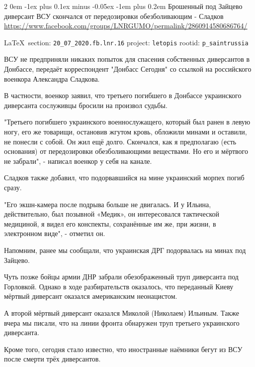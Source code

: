 \documentclass[a4paper,11pt]{extreport}
\makeatletter
\renewcommand\subsection{%
  \clearpage
    \@startsection{subsection}%
    {2}%
    {0em}%
    {-1ex plus 0.1ex minus -0.05ex}%
    {-1em plus 0.2em}%
    {\scshape\bfseries\Large}%
}
\makeatother
\begin{document}
\subsection{Брошенный под Зайцево диверсант ВСУ скончался от передозировки обезболивающим - Сладков}
\label{sec:20_07_2020.fb.lnr.16}
\url{https://www.facebook.com/groups/LNRGUMO/permalink/2860914580686764/}
  
\vspace{0.5cm}
{\small\LaTeX~section: \verb|20_07_2020.fb.lnr.16| project: \verb|letopis| rootid: \verb|p_saintrussia|}
\vspace{0.5cm}

ВСУ не предприняли никаких попыток для спасения собственных диверсантов в
Донбассе, передаёт корреспондент "Донбасс Сегодня" со ссылкой на российского
военкора Александра Сладкова.

В частности, военкор заявил, что третьего погибшего в Донбассе украинского
диверсанта сослуживцы бросили на произвол судьбы.

"Третьего погибшего украинского военнослужащего, который был ранен в левую
ногу, его же товарищи, остановив жгутом кровь, обложили минами и оставили, не
понесли с собой. Он жил ещё долго.  Скончался, как я предполагаю (есть
основания) от передозировки обезболивающими веществами. Но его и мёртвого не
забрали", - написал военкор у себя на канале.

Сладков также добавил, что подорвавшийся на мине украинский морпех погиб сразу.

"Его экшн-камера после подрыва больше не двигалась.  И у Ильина, действительно,
был позывной «Медик», он интересовался тактической медициной, я видел его
конспекты, сохранённые им же, при жизни, в электронном виде", - отметил он.

Напомним, ранее мы сообщали, что украинская ДРГ подорвалась на минах под
Зайцево.

Чуть позже бойцы армии ДНР забрали обезображенный труп диверсанта под
Горловкой. Однако в ходе разбирательств оказалось, что переданный Киеву мёртвый
диверсант оказался американским неонацистом.

А второй мёртвый диверсант оказался Миколой (Николаем) Ильиным.  Также вчера мы
писали, что на линии фронта обнаружен труп третьего украинского диверсанта.

Кроме того, сегодня стало известно, что иностранные наёмники бегут из ВСУ после
смерти трёх диверсантов. 
 
\end{document}
